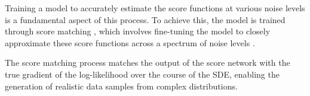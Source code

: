 Training a model to accurately estimate the score functions at various noise levels is a fundamental aspect of this process. To achieve this, the model is trained through score matching \citep{hyvarinenScoreMatching}, which involves fine-tuning the model to closely approximate these score functions across a spectrum of noise levels \citep{song2020score}. 

 
 The score matching process matches the output of the score network with the true gradient of the log-likelihood over the course of the SDE, enabling the generation of realistic data samples from complex distributions.